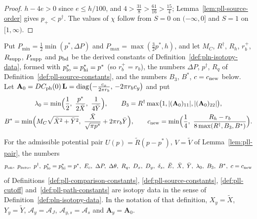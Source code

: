 \begin{proof}
$h-4e>0$ since $e\le h/100$, and $4>\frac{31}8>\frac{61}{16}>\frac{15}4$; Lemma~\ref{lem:pll-source-order} gives $p_+<p^\dagger$. The values of $\chi$ follow from $S=0$ on $(-\infty,0]$ and $S=1$ on $[1,\infty)$.
\end{proof}

\begin{definition}\label{def:pll-path-constants}
Put $P_{\min}=\frac12\min(p^*,\Delta P)$ and $P_{\max}=\max(\frac32p^*,h)$, and let $M_C$, $R^\dagger$, $R_h$, $r_b^+$,
$R_{\rm supp}$, $P_{\rm supp}$ and $p_{\rm bd}$ be the derived constants of Definition~\ref{def:pln-isotopy-data}, formed
with $p^*_{\rm lo}=p^*_{\rm hi}=p^*$ (so $r_b^+=r_b$), the numbers $\Delta P$, $p^\dagger$, $R_q$ of
Definition~\ref{def:pll-source-constants}, and the numbers $B_3$, $B^*$, $c=c_{\rm new}$ below. Let $\mathbf A_0=DC_{\rm ph}(0)\,\mathbf L=\operatorname{diag}\bigl(-\frac{c_x}{2\pi r_b},\,-2\pi r_bc_y\bigr)$
and put
\begin{gather*}
 \lambda_0=\min\Bigl(\frac12,\ \frac{p^*}{2\bar X},\ \frac1{4\bar Y}\Bigr),\qquad
 B_3=R^\dagger\max\bigl(1,|(\mathbf A_0)_{11}|,|(\mathbf A_0)_{22}|\bigr),\\
 B^*=\min\Bigl(M_C\sqrt{\bar X^2+\bar Y^2},\ \frac{\bar X}{\sqrt{\pi p^*}}+2\pi r_b\bar Y\Bigr),\qquad
 c_{\rm new}=\min\Bigl(\frac14,\ \frac{R_h-r_b}{8\max(R^\dagger,B_3,B^*)}\Bigr).
\end{gather*}
\end{definition}

\begin{lemma}\label{lem:pll-instance}
For the admissible potential pair $U(p)=\tilde R(p-p^*)$, $V=\tilde V$ of Lemma~\ref{lem:pll-pair}, the numbers
\[
 p_{\rm on},\ p_{\rm zero},\ p^\dagger,\ p^*_{\rm lo}=p^*_{\rm hi}=p^*,\ E_c,\ \Delta P,\ \Delta\theta,\ R_q,\ D_x,\ D_y,\
 \delta_s,\ \bar E,\ \bar X,\ \bar Y,\ \lambda_0,\ B_3,\ B^*,\ c=c_{\rm new}
\]
of Definitions~\ref{def:pll-comparison-constants}, \ref{def:pll-source-constants}, \ref{def:pll-cutoff}
and~\ref{def:pll-path-constants} are isotopy data in the sense of Definition~\ref{def:pln-isotopy-data}. In the
notation of that definition, $X_y=\tilde X$, $Y_y=\tilde Y$, $\mathcal A_y=\mathcal A_J$, $\mathcal A_{y,s}=\mathcal A_s$
and $\mathbf A_y=\mathbf A_0$.
\end{lemma}

